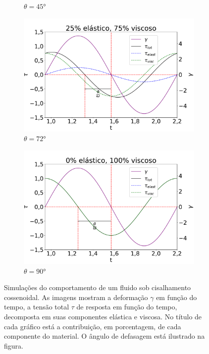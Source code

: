 \begin{figure}[h]
\begin{subfigure}[t]{0.3\textwidth}
					\caption{\(\theta=45°\)}
					\label{fig:osc_sim50}
				\end{subfigure}
			
				\hspace{2.5cm} \begin{subfigure}[t]{0.3\textwidth}
					\centering
					\includegraphics[width=\textwidth]{./imagens/reologia/Simulacao_visc_75}
					\caption{\(\theta=72°\)}
					\label{fig:osc_sim75}
				\end{subfigure}%
				\begin{subfigure}[t]{0.3\textwidth}
					\centering
					\includegraphics[width=\textwidth]{./imagens/reologia/Simulacao_visc_100}
					\caption{\(\theta=90°\)}
					\label{fig:osc_sim100}
				\end{subfigure}%
			\caption{Simulações do comportamento de um fluido sob cisalhamento cossenoidal. As imagens mostram a deformação \(\gamma\) em função do tempo, a tensão total \(\tau\) de resposta em função do tempo, decomposta em suas componentes elástica e viscosa. No título de cada gráfico está a contribuição, em porcentagem, de cada componente do material. O ângulo de defasagem está ilustrado na figura.}
			\label{fig:osc_simulacoes}
			\end{figure} 
			

